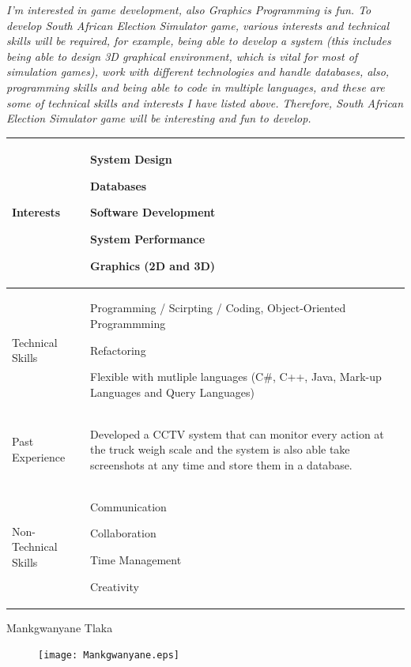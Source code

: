\documentclass{article}
\begin{document}
 	\textit{I'm interested in game development, also Graphics Programming is fun. To develop South African Election Simulator game, various interests and technical skills will be required, for example, being able to develop a system (this includes being able to design 3D graphical environment, which is vital for most of simulation games), work with different technologies and handle databases, also, programming skills and being able to code in multiple languages, and these are some of technical skills and interests I have listed above. Therefore, South African Election Simulator game will be interesting and fun to develop.}

\begin{center}
\begin{tabularx}{1.0\textwidth}{|p{3cm}|X|}
\hline
 {\LARGE Interests} & 
 \begin{compactitem}
     \item {\large System Design}
     \item {\large Databases}
     \item {\large Software Development}
	 \item {\large System Performance}
	 \item {\large Graphics (2D and 3D)}
 \end{compactitem} \\ 
 \hline
 {\LARGE Technical Skills} & 
 \begin{compactitem}
     \item {\large Programming / Scirpting / Coding, Object-Oriented Programmming}
     \item {\large Refactoring}
     \item {\large Flexible with mutliple languages (C#, C++, Java, Mark-up Languages and Query Languages)}
 \end{compactitem} \\ 
 \hline
 {\LARGE Past Experience} & 
 \begin{compactitem}
     \item {\large Developed a CCTV system that can monitor every action at the truck weigh scale and the system is also able take screenshots at any time and store them in a database.}
 \end{compactitem} \\ 
 \hline
 {\LARGE Non-Technical Skills} & 
 \begin{compactitem}
     \item {\large Communication}
     \item {\large Collaboration}
	 \item {\large Time Management}
	 \item {\large Creativity}
 \end{compactitem} \\
 \hline 
\end{tabularx}
\end{center}
\pagebreak
{\huge Mankgwanyane Tlaka}
\begin{figure}[h]
\centering
\texttt{[image: Mankgwanyane.eps]} 
\end{figure}
\end{document}
